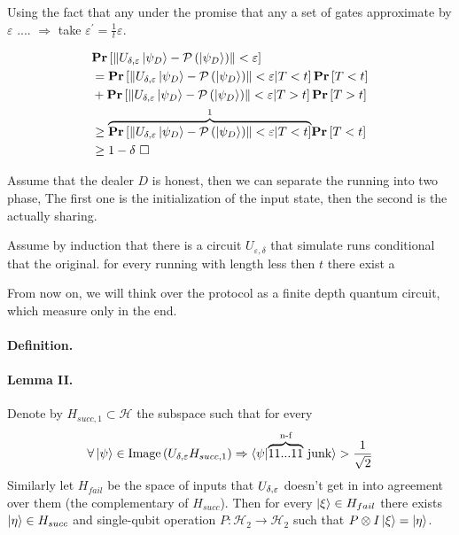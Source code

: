\documentclass{article}
\begin{document}
\begin{multicols*}{2}
 Using the fact that any under the promise that any a set of gates approximate by \(\varepsilon\) .... \(\Rightarrow\) take \(\varepsilon^\prime = \frac{1}{t}\varepsilon\).

\begin{equation*}
    \begin{split}
        & \mathbf{Pr} \left[ {\left\lVert U_{\delta,\varepsilon}\ket{\psi_{D}} - \mathcal{P}\left(\ket{\psi_{D}}\right)\right\rVert < \varepsilon} \right]  \\
        & = \mathbf{Pr} \left[ {\left\lVert U_{\delta,\varepsilon}\ket{\psi_{D}} - \mathcal{P}\left(\ket{\psi_{D}}\right)\right\rVert < \varepsilon | T < t } \right]\mathbf{Pr} \left[ { T < t} \right]  \\ & +  \mathbf{Pr} \left[ {\left\lVert U_{\delta,\varepsilon}\ket{\psi_{D}} - \mathcal{P}\left(\ket{\psi_{D}}\right)\right\rVert < \varepsilon | T > t } \right]\mathbf{Pr} \left[ { T > t} \right] \\ & \ge \overset{1}{\overbrace{\mathbf{Pr} \left[ {\left\lVert U_{\delta,\varepsilon}\ket{\psi_{D}} - \mathcal{P}\left(\ket{\psi_{D}}\right)\right\rVert < \varepsilon | T < t} \right]}}\mathbf{Pr} \left[ { T < t} \right] \\ & \ge 1 - \delta  \ \square
    \end{split}
\end{equation*}




Assume that the dealer \(D\) is honest, then we can separate the running into two phase, The first one is the initialization of the input state, then the second is the actually sharing.



Assume by induction that there is a circuit \(U_{\varepsilon,\delta}\) that simulate runs conditional that the original. for every running with length less then \(t\) there exist a   

From now on, we will think over the protocol as a finite depth quantum circuit, which measure only in the end. 



\paragraph{Definition.} 

\paragraph{Lemma II.} Denote by \( H_{succ,1} \subset \mathcal{H} \) the subspace such that for every \begin{equation*}
    \forall \ket{\psi} \in \text{Image} \left( U_{\delta,\varepsilon } H_{succ,1} \right) \Rightarrow  \braket{\psi|\overset{\text{n-f}}{\overbrace{11...11}}\text{ junk}} > \frac{1}{\sqrt{2}}
\end{equation*}  Similarly let \( H_{fail} \) be the space of inputs that \( U_{\delta,\varepsilon } \) doesn't get in into agreement over them (the complementary of \( H_{succ} \)). Then for every \( \ket{ \xi} \in H_{fail} \)  there exists \( \ket{\eta} \in H_{succ} \) and single-qubit operation \( P : \mathcal{H}_2 \rightarrow \mathcal{H}_2 \) such that \( P \otimes I \ket{\xi} =\ket{\eta} \).   


\end{multicols*}
\end{document}

